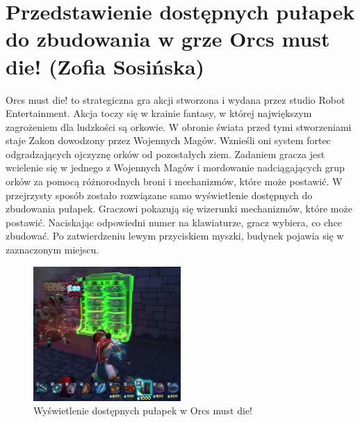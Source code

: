 \section{Przedstawienie dostępnych pułapek do zbudowania w grze Orcs must die! (Zofia Sosińska)}\label{chap:omd}

Orcs must die! to strategiczna gra akcji stworzona i wydana przez studio Robot Entertainment. Akcja toczy się w krainie fantasy, w której największym zagrożeniem dla ludzkości są orkowie. W obronie świata przed tymi stworzeniami staje Zakon dowodzony przez Wojennych Magów. Wznieśli oni system fortec odgradzających ojczyznę orków od pozostałych ziem. Zadaniem gracza jest wcielenie się w jednego z  Wojennych Magów i mordowanie nadciągających grup orków za pomocą różnorodnych broni i mechanizmów, które może postawić.
W przejrzysty sposób zostało rozwiązane samo wyświetlenie dostępnych do zbudowania pułapek. Graczowi pokazują się wizerunki mechanizmów, które może postawić. Naciskając odpowiedni numer na klawiaturze, gracz wybiera, co chce zbudować. Po zatwierdzeniu lewym przyciskiem myszki, budynek pojawia się w zaznaczonym miejscu.

\begin{figure}[h!tbp]
    \centering
    \includegraphics[width=0.5\textwidth]{images/ui/buoildingsOrcs.png}
    \caption{Wyświetlenie dostępnych pułapek w Orcs must die!}\label{fig:Orcs}
\end{figure}